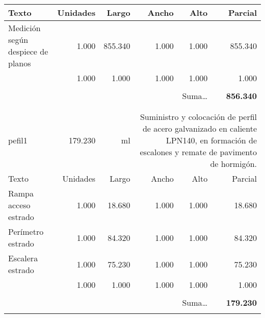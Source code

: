 \documentclass{book}%
\begin{document}
\begin{longtable}{lrrrrr}
Texto&Unidades&Largo&Ancho&Alto&Parcial\\%
\hline%
\multicolumn{1}{p{3.5cm}}{Medición según despiece de planos}&1.000&855.340&1.000&1.000&855.340\\%
\multicolumn{1}{p{3.5cm}}{}&1.000&1.000&1.000&1.000&1.000\\%
&&&&&\\%
\multicolumn{5}{r}{Suma\ldots}&\textbf{856.340}\\%
\hline%
&&&&&\\%
&&&&&\\%
pefil1&179.230& ml&\multicolumn{3}{p{6cm}}{\scriptsize Suministro y colocación de perfil de acero galvanizado en caliente LPN140, en formación de escalones y remate de pavimento de hormigón.\normalsize}\\%
Texto&Unidades&Largo&Ancho&Alto&Parcial\\%
\hline%
\multicolumn{1}{p{3.5cm}}{Rampa acceso estrado}&1.000&18.680&1.000&1.000&18.680\\%
\multicolumn{1}{p{3.5cm}}{Perímetro estrado}&1.000&84.320&1.000&1.000&84.320\\%
\multicolumn{1}{p{3.5cm}}{Escalera estrado}&1.000&75.230&1.000&1.000&75.230\\%
\multicolumn{1}{p{3.5cm}}{}&1.000&1.000&1.000&1.000&1.000\\%
&&&&&\\%
\multicolumn{5}{r}{Suma\ldots}&\textbf{179.230}\\%
\hline%
&&&&&\\%
\end{longtable}%
\newpage

%
\end{document}
